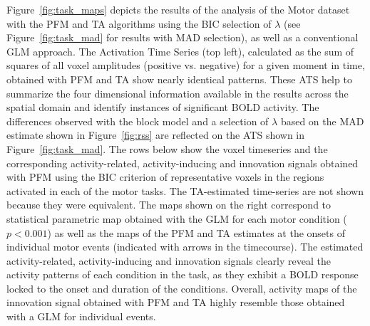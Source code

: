 Figure~\ref{fig:task_maps} depicts the results of the analysis of the Motor dataset with the PFM and TA algorithms using the BIC selection of $\lambda$ (see Figure~\ref{fig:task_mad} for results with MAD selection), as well as a conventional GLM approach. The Activation Time Series (top left), calculated as the sum of squares of all voxel amplitudes (positive vs. negative) for a given moment in time, obtained with PFM and TA show nearly identical patterns. These ATS help to summarize the four dimensional information available in the results across the spatial domain and identify instances of significant BOLD activity. The differences observed with the block model and a selection of $\lambda$ based on the MAD estimate shown in Figure~\ref{fig:rss} are reflected on the ATS shown in Figure~\ref{fig:task_mad}. The rows below show the voxel timeseries and the corresponding activity-related, activity-inducing and innovation signals obtained with PFM using the BIC criterion of representative voxels in the regions activated in each of the motor tasks. The TA-estimated time-series are not shown because they were equivalent. The maps shown on the right correspond to statistical parametric map obtained with the GLM for each motor condition ($p < 0.001$) as well as the maps of the PFM and TA estimates at the onsets of individual motor events (indicated with arrows in the timecourse). The estimated activity-related, activity-inducing and innovation signals clearly reveal the activity patterns of each condition in the task, as they exhibit a BOLD response locked to the onset and duration of the conditions. Overall, activity maps of the innovation signal obtained with PFM and TA highly resemble those obtained with a GLM for individual events.

